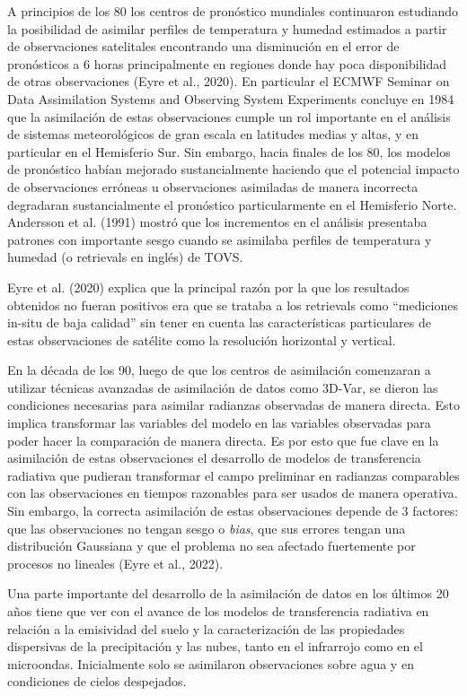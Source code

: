 \documentclass[12pt,oneside,a4paper]{reedthesis}
\begin{document}
A principios de los 80 los centros de pronóstico mundiales continuaron estudiando la posibilidad de asimilar perfiles de temperatura y humedad estimados a partir de observaciones satelitales encontrando una disminución en el error de pronósticos a 6 horas principalmente en regiones donde hay poca disponibilidad de otras observaciones (Eyre et al., 2020). En particular el ECMWF Seminar on Data Assimilation Systems and Observing System Experiments concluye en 1984 que la asimilación de estas observaciones cumple un rol importante en el análisis de sistemas meteorológicos de gran escala en latitudes medias y altas, y en particular en el Hemisferio Sur. Sin embargo, hacia finales de los 80, los modelos de pronóstico habían mejorado sustancialmente haciendo que el potencial impacto de observaciones erróneas u observaciones asimiladas de manera incorrecta degradaran sustancialmente el pronóstico particularmente en el Hemisferio Norte. Andersson et al. (1991) mostró que los incrementos en el análisis presentaba patrones con importante sesgo cuando se asimilaba perfiles de temperatura y humedad (o retrievals en inglés) de TOVS.

Eyre et al. (2020) explica que la principal razón por la que los resultados obtenidos no fueran positivos era que se trataba a los retrievals como ``mediciones in-situ de baja calidad'' sin tener en cuenta las características particulares de estas observaciones de satélite como la resolución horizontal y vertical.

En la década de los 90, luego de que los centros de asimilación comenzaran a utilizar técnicas avanzadas de asimilación de datos como 3D-Var, se dieron las condiciones necesarias para asimilar radianzas observadas de manera directa. Esto implica transformar las variables del modelo en las variables observadas para poder hacer la comparación de manera directa. Es por esto que fue clave en la asimilación de estas observaciones el desarrollo de modelos de transferencia radiativa que pudieran transformar el campo preliminar en radianzas comparables con las observaciones en tiempos razonables para ser usados de manera operativa. Sin embargo, la correcta asimilación de estas observaciones depende de 3 factores: que las observaciones no tengan sesgo o \emph{bias}, que sus errores tengan una distribución Gaussiana y que el problema no sea afectado fuertemente por procesos no lineales (Eyre et al., 2022).

Una parte importante del desarrollo de la asimilación de datos en los últimos 20 años tiene que ver con el avance de los modelos de transferencia radiativa en relación a la emisividad del suelo y la caracterización de las propiedades dispersivas de la precipitación y las nubes, tanto en el infrarrojo como en el microondas. Inicialmente solo se asimilaron observaciones sobre agua y en condiciones de cielos despejados.
\end{document}

